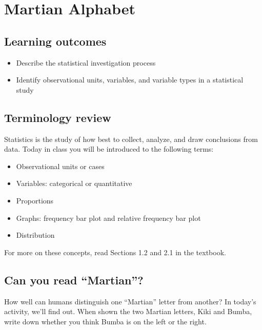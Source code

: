 \documentclass[
]{report}
\begin{document}
\hypertarget{martian-alphabet}{%
\chapter{Martian Alphabet}\label{martian-alphabet}}

\hypertarget{learning-outcomes}{%
\section{Learning outcomes}\label{learning-outcomes}}

\begin{itemize}
\item
  Describe the statistical investigation process
\item
  Identify observational units, variables, and variable types in a statistical study
\end{itemize}

\hypertarget{terminology-review}{%
\section{Terminology review}\label{terminology-review}}

Statistics is the study of how best to collect, analyze, and draw conclusions from data. Today in class you will be introduced to the following terms:

\begin{itemize}
\item
  Observational units or cases
\item
  Variables: categorical or quantitative
\item
  Proportions
\item
  Graphs: frequency bar plot and relative frequency bar plot
\item
  Distribution
\end{itemize}

For more on these concepts, read Sections 1.2 and 2.1 in the textbook.

\hypertarget{can-you-read-martian}{%
\section{Can you read ``Martian''?}\label{can-you-read-martian}}

How well can humans distinguish one ``Martian'' letter from another? In today's activity, we'll find out. When shown the two Martian letters, Kiki and Bumba, write down whether you think Bumba is on the left or the right.
\end{document}
